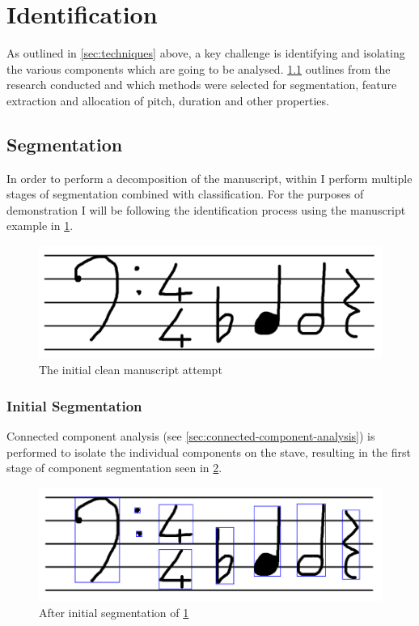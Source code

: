 \section{Identification}\label{sec:identification}

As outlined in \cref{sec:techniques} above, a key challenge is identifying and isolating the various components which are going to be analysed. \cref{sec:segmentation} outlines from the research conducted and which methods were selected for segmentation, feature extraction and allocation of pitch, duration and other properties.

\subsection{Segmentation}\label{sec:segmentation}

In order to perform a decomposition of the manuscript, within \noteED I perform multiple stages of segmentation combined with classification. For the purposes of demonstration I will be following the identification process using the manuscript example in \cref{fig:canvas-initial}.

\begin{figure}[hbt]
  \includegraphics[width=\linewidth]{gfx/techniques/labelling/initial.png}
  \caption{The initial clean manuscript attempt}
  \label{fig:canvas-initial}
\end{figure}
\subsubsection{Initial Segmentation}

Connected component analysis (see \cref{sec:connected-component-analysis}) is performed to isolate the individual components on the stave, resulting in the first stage of component segmentation seen in \cref{fig:canvas-segmentation-1}.

\begin{figure}[hbt]
  \includegraphics[width=\linewidth]{gfx/techniques/labelling/initial-segmentation.png}
  \caption{After initial segmentation of \cref{fig:canvas-initial}}
  \label{fig:canvas-segmentation-1}
\end{figure}

